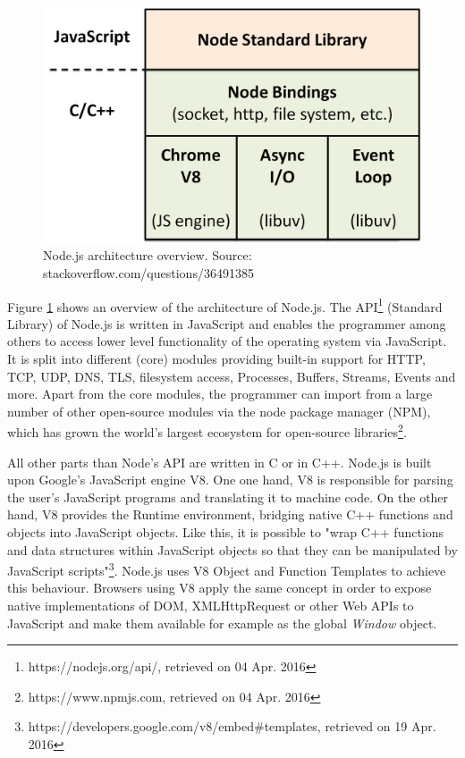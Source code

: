 \begin{figure}
	\centering
	\includegraphics[scale=0.5]{figures/node.png}
	\caption{Node.js architecture overview. Source: stackoverflow.com/questions/36491385}
	\label{fig:node}
\end{figure}
Figure \ref{fig:node} shows an overview of the architecture of Node.js. The API\footnote{https://nodejs.org/api/, retrieved on 04 Apr. 2016} (Standard Library) of Node.js is written in JavaScript and enables the programmer among others to access lower level functionality of the operating system via JavaScript. It is split into different (core) modules providing built-in support for HTTP, TCP, UDP, DNS, TLS, filesystem access, Processes, Buffers, Streams, Events and more. Apart from the core modules, the programmer can import from a large number of other open-source modules via the node package manager (NPM), which has grown the world's largest ecosystem for open-source libraries\footnote{https://www.npmjs.com, retrieved on 04 Apr. 2016}. 

All other parts than Node's API are written in C or in C++. Node.js is built upon Google's JavaScript engine V8. One one hand, V8 is responsible for parsing the user's JavaScript programs and translating it to machine code. On the other hand, V8 provides the Runtime environment, bridging native C++ functions and objects into JavaScript objects. Like this, it is possible to "wrap C++ functions and data structures within JavaScript objects so that they can be manipulated by JavaScript scripts"\footnote{https://developers.google.com/v8/embed\#templates, retrieved on 19 Apr. 2016}. Node.js uses V8 Object and Function Templates to achieve this behaviour. Browsers using V8 apply the same concept in order to expose native implementations of DOM, XMLHttpRequest or other Web APIs to JavaScript and make them available for example as the global \textit{Window} object. 

